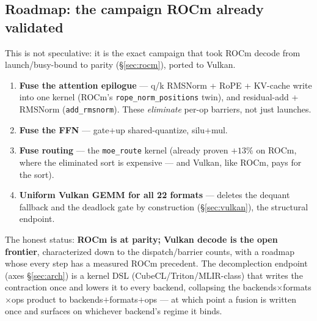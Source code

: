 \documentclass[11pt]{article}
\begin{document}
\subsection{Roadmap: the campaign ROCm already validated}
\label{sec:vulkan-roadmap}
This is not speculative: it is the exact campaign that took ROCm decode from launch/busy-bound to
parity (\S\ref{sec:rocm}), ported to Vulkan.
\begin{enumerate}[noitemsep]
  \item \textbf{Fuse the attention epilogue} --- q/k RMSNorm + RoPE + KV-cache write into one
        kernel (ROCm's \texttt{rope\_norm\_positions} twin), and residual-add + RMSNorm
        (\texttt{add\_rmsnorm}). These \emph{eliminate} per-op barriers, not just launches.
  \item \textbf{Fuse the FFN} --- gate+up shared-quantize, silu+mul.
  \item \textbf{Fuse routing} --- the \texttt{moe\_route} kernel (already proven $+13\%$ on ROCm,
        where the eliminated sort is expensive --- and Vulkan, like ROCm, pays for the sort).
  \item \textbf{Uniform Vulkan GEMM for all 22 formats} --- deletes the dequant fallback and the
        deadlock gate by construction (\S\ref{sec:vulkan}), the structural endpoint.
\end{enumerate}
The honest status: \textbf{ROCm is at parity; Vulkan decode is the open frontier}, characterized
down to the dispatch/barrier counts, with a roadmap whose every step has a measured ROCm precedent.
The decomplection endpoint (axes \S\ref{sec:arch}) is a kernel DSL (CubeCL/Triton/MLIR-class) that
writes the contraction once and lowers it to every backend, collapsing the
backends$\times$formats$\times$ops product to backends$+$formats$+$ops --- at which point a fusion is
written once and surfaces on whichever backend's regime it binds.
\end{document}
